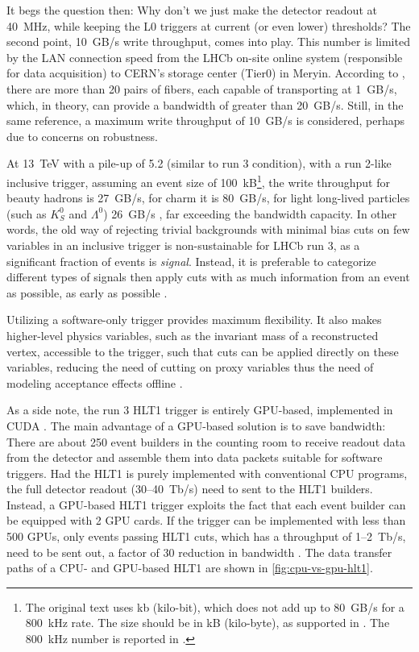 It begs the question then: Why don't we just make the detector readout at
40~MHz, while keeping the L0 triggers at current (or even lower) thresholds?
The second point, 10~GB/s write throughput,
comes into play.
This number is limited by the LAN connection speed from the LHCb on-site online
system (responsible for data acquisition) to CERN's storage center (Tier0) in
Meryin.
According to \cite{CERN-LHCC-2014-016},
there are more than 20 pairs of fibers, each capable of transporting at 1~GB/s,
which, in theory, can provide a bandwidth of greater than 20~GB/s.
Still, in the same reference, a maximum write throughput of 10~GB/s is
considered, perhaps due to concerns on robustness.

At 13~TeV with a pile-up of 5.2 (similar to run 3 condition),
with a run 2-like inclusive trigger,
assuming an event size of 100~kB\footnote{
    The original text uses kb (kilo-bit), which does not add up to 80~GB/s for
    a 800~kHz rate.
    The size should be in kB (kilo-byte), as supported in
    \cite{CERN-LHCC-2014-016,Allen_GPU_2020}.
    The 800~kHz number is reported in \cite{LHCb-PUB-2014-027}.
},
the write throughput for beauty hadrons is 27~GB/s, for charm it is 80~GB/s,
for light long-lived particles (such as $K^0_S$ and $\Lambda^0$) 26~GB/s
\cite{Albrecht_2014},
far exceeding the bandwidth capacity.
In other words,
the old way of rejecting trivial backgrounds with minimal bias cuts on few
variables in an inclusive trigger is non-sustainable for LHCb run 3,
as a significant fraction of events is \emph{signal}.
Instead, it is preferable to categorize different types of signals then apply
cuts with as much information from an event as possible, as early as possible
\cite{Albrecht_2014}.

Utilizing a software-only trigger provides maximum flexibility.
It also makes higher-level physics variables,
such as the invariant mass of a reconstructed vertex,
accessible to the trigger,
such that cuts can be applied directly on these variables,
reducing the need of cutting on proxy variables thus the need of modeling
acceptance effects offline \cite{Albrecht_2014}.

As a side note, the run 3 HLT1 trigger is entirely GPU-based, implemented in
CUDA \cite{Allen_GPU_2020}.
The main advantage of a GPU-based solution is to save bandwidth:
There are about 250 event builders in the counting room to receive readout data
from the detector and assemble them into data packets suitable for software
triggers.
Had the HLT1 is purely implemented with conventional CPU programs,
the full detector readout (30--40~Tb/s) need to sent to the HLT1 builders.
Instead, a GPU-based HLT1 trigger exploits the fact that each event builder
can be equipped with 2 GPU cards.
If the trigger can be implemented with less than 500 GPUs,
only events passing HLT1 cuts, which has a throughput of 1--2~Tb/s,
need to be sent out,
a factor of 30 reduction in bandwidth \cite{Allen_GPU_2020}.
The data transfer paths of a CPU- and GPU-based HLT1 are shown in
\cref{fig:cpu-vs-gpu-hlt1}.

